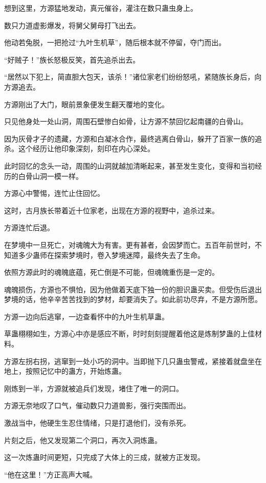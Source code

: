 \begin{this_body}
想到这里，方源猛地发动，真元催谷，灌注在数只蛊虫身上。

数只力道虚影爆发，将舅父舅母打飞出去。

他动若兔脱，一把抢过“九叶生机草”，随后根本就不停留，夺门而出。

“好贼子！”族长怒极反笑，首先追杀出去。

“居然以下犯上，简直胆大包天，该杀！”诸位家老们纷纷怒吼，紧随族长身后，向方源追去。

方源刚出了大门，眼前景象便发生翻天覆地的变化。

只见他身处一处山洞，周围石壁惨白如骨，让方源不禁回忆起南疆的白骨山。

因为灰骨才子的遗藏，方源和白凝冰合作，最终逃离白骨山，躲开了百家一族的追杀。这个经历让他印象深刻，刻印在内心深处。

此时回忆的念头一动，周围的山洞就越加清晰起来，甚至发生变化，变得和当初经历的白骨山洞一模一样。

方源心中警惕，连忙止住回忆。

这时，古月族长带着近十位家老，出现在方源的视野中，追杀过来。

方源连忙后退。

在梦境中一旦死亡，对魂魄大为有害。更有甚者，会因梦而亡。五百年前世时，不知道多少蛊师在探索梦境时，卷入梦境迷障，最终失去了生命。

依照方源此时的魂魄底蕴，死亡倒是不可能，但魂魄重伤是一定的。

魂魄损伤，方源也不惧怕，因为他做着天底下独一份的胆识蛊买卖。但受伤后退出梦境的话，他辛辛苦苦找到的梦材，却要消失了。如此前功尽弃，不是方源所愿。

方源一边向后逃窜，一边查看怀中的九叶生机草蛊。

草蛊栩栩如生，方源心中亦是感应不断，时时刻刻提醒着他这是炼制梦蛊的上佳材料。

方源左拐右拐，逃窜到一处小巧的洞中。当即抛下几只蛊虫警戒，紧接着就盘坐在地上，按照记忆中的蛊方，开始炼蛊。

刚炼到一半，方源就被追兵们发现，堵住了唯一的洞口。

方源无奈地叹了口气，催动数只力道兽影，强行突围而出。

激战当中，他硬生生忍住情绪，只是打退他们，没有杀死。

片刻之后，他又发现第二个洞口，再次入洞炼蛊。

这一次炼蛊时间更短，只完成了大体上的三成，就被方正发现。

“他在这里！”方正高声大喊。


\end{this_body}
